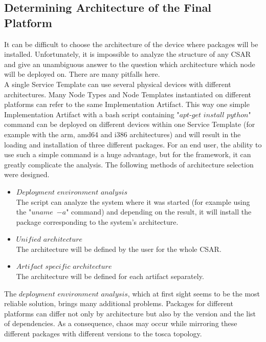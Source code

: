 \subsection{Determining Architecture of the Final Platform} \label{finplatf}
It can be difficult to choose the architecture of the device where packages will be installed.
Unfortunately, it is impossible to analyze the structure of any CSAR and give an unambiguous answer to the question which architecture which node will be deployed on.
There are many pitfalls here.\\
A single Service Template can use several physical devices with different architectures.
Many Node Types and Node Templates instantiated on different platforms can refer to the same Implementation Artifact.
This way one simple Implementation Artifact with a bash script containing "$apt$-$get$ $install$ $python$" command can be deployed on different devices within one Service Template (for example with the arm, amd64 and i386 architectures) and will result in the loading and installation of three different packages. 
For an end user, the ability to use such a simple command is a huge advantage, but for the framework, it can greatly complicate the analysis.
The following methods of architecture selection were designed.
\begin{itemize}
	\item $Deployment$ $environment$ $analysis$\\
	The script can analyze the system where it was started (for example using the "$uname$~$-a$" command) and depending on the result, it will install the package corresponding to the system's architecture.
	\item $Unified$ $architecture$\\
	The architecture will be defined by the user for the whole CSAR.
	\item $Artifact$ $specific$ $architecture$\\
	The architecture will be defined for each artifact separately.
\end{itemize}
The $deployment$ $environment$ $analysis$, which at first sight seems to be the most reliable solution, brings many additional problems.
Packages for different platforms can differ not only by architecture but also by the version and the list of dependencies.
As a consequence, chaos may occur while  mirroring these different packages with different versions to the \gls{tosca} topology.
